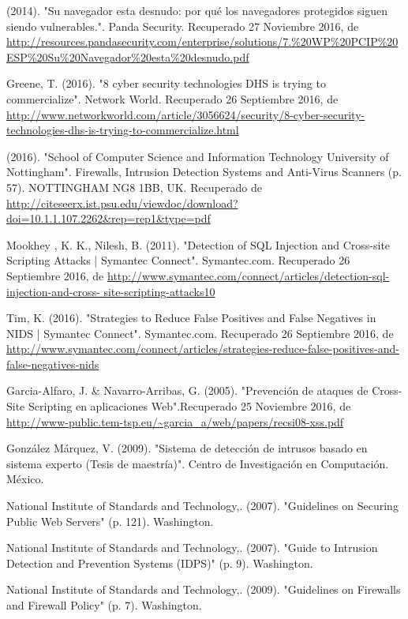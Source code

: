 \begin{thebibliography}{99}
 (2014). "Su navegador esta desnudo: por qué los navegadores protegidos siguen siendo vulnerables.". Panda Security. Recuperado 27 Noviembre 2016, de \url{http://resources.pandasecurity.com/enterprise/solutions/7.\%20WP\%20PCIP\%20ESP\%20Su\%20Navegador\%20esta\%20desnudo.pdf}

 Greene, T. (2016). "8 cyber security technologies DHS is trying to commercialize". Network World. Recuperado 26 Septiembre 2016, de \url{http://www.networkworld.com/article/3056624/security/8-cyber-security-technologies-dhs-is-trying-to-commercialize.html}

 (2016). "School of Computer Science and Information Technology University of Nottingham". Firewalls, Intrusion Detection Systems and Anti-Virus Scanners (p. 57). NOTTINGHAM NG8 1BB, UK. Recuperado de \url{http://citeseerx.ist.psu.edu/viewdoc/download?doi=10.1.1.107.2262\&rep=rep1\&type=pdf}

 Mookhey , K. K., Nilesh, B. (2011). "Detection of SQL Injection and Cross-site Scripting Attacks | Symantec Connect".
Symantec.com. Recuperado 26 Septiembre 2016, de \url{http://www.symantec.com/connect/articles/detection-sql-injection-and-cross- site-scripting-attacks10}

 Tim, K. (2016). "Strategies to Reduce False Positives and False Negatives in NIDS | Symantec Connect". Symantec.com.
Recuperado 26 Septiembre 2016, de \url{http://www.symantec.com/connect/articles/strategies-reduce-false-positives-and-false-negatives-nids}

 Garcia-Alfaro, J. \& Navarro-Arribas, G. (2005). "Prevención de ataques de Cross-Site Scripting en aplicaciones Web".Recuperado 25 Noviembre 2016, de \url{http://www-public.tem-tsp.eu/~garcia\_a/web/papers/recsi08-xss.pdf}

 González Márquez, V. (2009). "Sistema de detección de intrusos basado en sistema experto (Tesis de maestría)". Centro de Investigación en Computación. México.

 National Institute of Standards and Technology,. (2007). "Guidelines on Securing Public Web Servers" (p. 121). Washington.

 National Institute of Standards and Technology,. (2007). "Guide to Intrusion Detection and Prevention Systems (IDPS)" (p. 9). Washington.

 National Institute of Standards and Technology,. (2009). "Guidelines on Firewalls and Firewall Policy" (p. 7). Washington.


\end{thebibliography}
